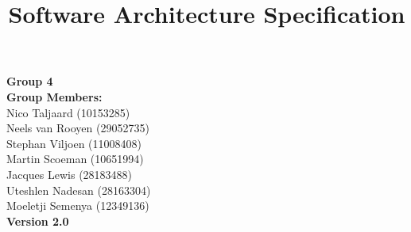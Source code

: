 \documentclass[12pt]{article}
\title{Software Architecture Specification}
\begin{document}

\maketitle

\vspace{4em}

\begin{center}%

  \LARGE {\bf Group 4}\\[2em]
  \LARGE {\bf Group Members:}\\[1em]
  \large
      Nico Taljaard			(10153285)	\\
      Neels van Rooyen		(29052735)	\\
	  Stephan Viljoen       (11008408)  \\
	  Martin Scoeman		(10651994)	\\
	  Jacques Lewis			(28183488)	\\
	  Uteshlen Nadesan		(28163304)	\\
	  Moeletji Semenya		(12349136)	\\[6em]
      
      {\bf Version 2.0}
    
\end{center}%

\newpage

\end{document}
